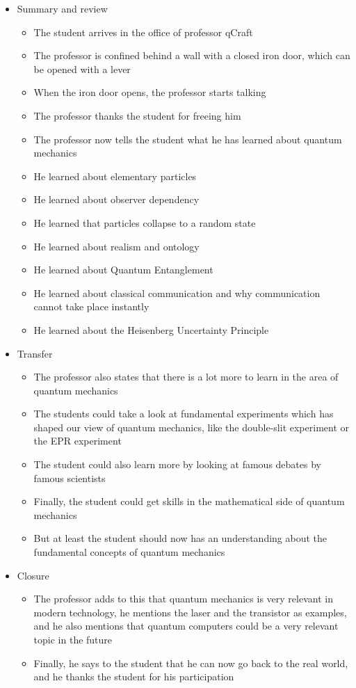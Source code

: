 \documentclass[11pt,twoside]{report} %
\begin{document}
\begin{itemize}
	\item Summary and review
	\begin{itemize}
		\item The student arrives in the office of professor qCraft
		\item The professor is confined behind a wall with a closed iron door, which can be opened with a lever
		\item When the iron door opens, the professor starts talking
		\item The professor thanks the student for freeing him
		\item The professor now tells the student what he has learned about quantum mechanics
		\item He learned about elementary particles
		\item He learned about observer dependency
		\item He learned that particles collapse to a random state
		\item He learned about realism and ontology
		\item He learned about Quantum Entanglement
		\item He learned about classical communication and why communication cannot take place instantly
		\item He learned about the Heisenberg Uncertainty Principle
	\end{itemize}
	\item Transfer
	\begin{itemize}
		\item The professor also states that there is a lot more to learn in the area of quantum mechanics
		\item The students could take a look at fundamental experiments which has shaped our view of quantum mechanics, like the double-slit experiment or the EPR experiment
		\item The student could also learn more by looking at famous debates by famous scientists
		\item Finally, the student could get skills in the mathematical side of quantum mechanics
		\item But at least the student should now has an understanding about the fundamental concepts of quantum mechanics
	\end{itemize}
	\item Closure
	\begin{itemize}
		\item The professor adds to this that quantum mechanics is very relevant in modern technology, he mentions the laser and the transistor as examples, and he also mentions that quantum computers could be a very relevant topic in the future
		\item Finally, he says to the student that he can now go back to the real world, and he thanks the student for his participation
	\end{itemize}
\end{itemize}
\end{document}
